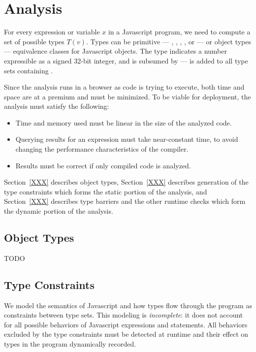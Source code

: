 
\section{Analysis}

For every expression or variable $x$ in a Javascript program,
we need to compute a set of possible types $T(v)$.
Types can be primitive --- , , ,
, 
or  --- or object types --- equivalence classes for
Javascript objects.
The  type indicates a number expressible as a signed 32-bit integer,
and is subsumed by  ---  is added to all type
sets containing .

Since the analysis runs in a browser as code is trying to execute,
both time and space are at a premium and must be minimized.
To be viable for deployment, the analysis must satisfy the following:

\begin{itemize}

\item Time and memory used must be linear in the size of the analyzed code.

\item Querying results for an expression must take near-constant time,
to avoid changing the performance characteristics of the compiler.

\item Results must be correct if only compiled code is analyzed.

\end{itemize}

Section~\ref{XXX} describes object types, Section~\ref{XXX} describes
generation of the type constraints which forms the static portion of
the analysis, and Section~\ref{XXX} describes type barriers and the
other runtime checks which form the dynamic portion of the analysis.

\subsection{Object Types}

TODO

\subsection{Type Constraints}

We model the semantics of Javascript and how types flow through the
program as constraints between type sets.
This modeling is {\it incomplete}: it does not account for all possible
behaviors of Javascript expressions and statements.
All behaviors excluded by the type constraints must be detected at runtime
and their effect on types in the program dynamically recorded.

